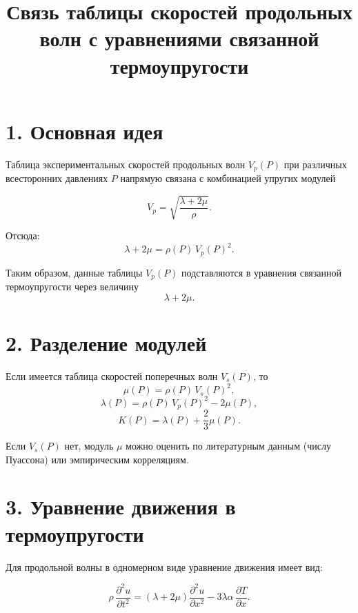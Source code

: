 \documentclass[12pt]{article}
\title{Связь таблицы скоростей продольных волн с уравнениями связанной термоупругости}
\author{}
\date{}
\begin{document}
\maketitle

\section*{1. Основная идея}

Таблица экспериментальных скоростей продольных волн $V_p(P)$ при различных всесторонних давлениях $P$ напрямую связана с комбинацией упругих модулей

\begin{equation}
V_p = \sqrt{\frac{\lambda + 2\mu}{\rho}}.
\end{equation}

Отсюда:
\begin{equation}
\lambda + 2\mu = \rho(P)\,V_p(P)^2.
\end{equation}

Таким образом, данные таблицы $V_p(P)$ подставляются в уравнения связанной термоупругости через величину
\begin{equation}
\lambda+2\mu.
\end{equation}
\section*{2. Разделение модулей}

Если имеется таблица скоростей поперечных волн $V_s(P)$, то
\begin{equation}
\mu(P) = \rho(P)\,V_s(P)^2,
\end{equation}
\begin{equation}
\lambda(P) = \rho(P)\,V_p(P)^2 - 2\mu(P),
\end{equation}
\begin{equation}
K(P) = \lambda(P) + \frac{2}{3}\mu(P).
\end{equation}

Если $V_s(P)$ нет, модуль $\mu$ можно оценить по литературным данным (числу Пуассона) или эмпирическим корреляциям.

\section*{3. Уравнение движения в термоупругости}

Для продольной волны в одномерном виде уравнение движения имеет вид:

\begin{equation}
\rho\,\frac{\partial^2 u}{\partial t^2}
=
(\lambda+2\mu)\frac{\partial^2 u}{\partial x^2}
-
3\lambda\alpha\,\frac{\partial T}{\partial x}.
\end{equation}
\end{document}
